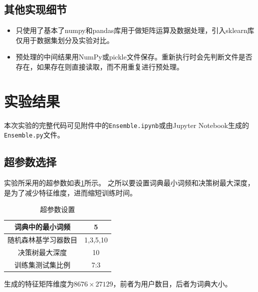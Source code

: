 \documentclass[logo,reportComp]{thesis}
\begin{document}
\subsection{其他实现细节}
\begin{itemize}
\item 只使用了基本了numpy和pandas库用于做矩阵运算及数据处理，引入sklearn库仅用于数据集划分及实验对比。
\item 预处理的中间结果用NumPy或pickle文件保存。重新执行时会先判断文件是否存在，如果存在则直接读取，而不用重复进行预处理。
\end{itemize}

\section{实验结果}
本次实验的完整代码可见附件中的\verb'Ensemble.ipynb'或由Jupyter Notebook生成的\verb'Ensemble.py'文件。

\subsection{超参数选择}
实验所采用的超参数如表\ref{tab:hyperparam}所示。
之所以要设置词典最小词频和决策树最大深度，是为了减少特征维度，进而缩短训练时间。
\begin{table}[H]
\caption{超参数设置}
\label{tab:hyperparam}
\centering
\begin{tabular}{|c|c|}\hline
词典中的最小词频 & 5 \\\hline
随机森林基学习器数目 & 1,3,5,10\\\hline
决策树最大深度 & 10\\\hline
训练集测试集比例 & 7:3\\\hline
\end{tabular}
\end{table}

生成的特征矩阵维度为$8676\times 27129$，前者为用户数目，后者为词典大小。
\end{document}
